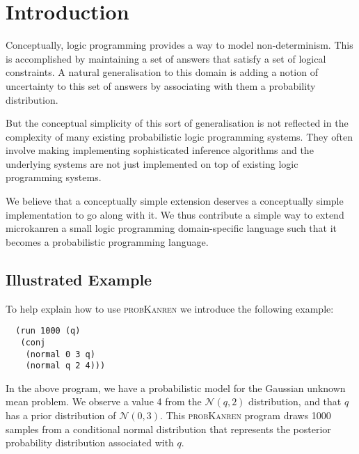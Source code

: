 \documentclass[
]{ceurart}
\begin{document}
\maketitle

\section{Introduction}

Conceptually, logic programming provides a way to model
non-determinism. This is accomplished by maintaining a set of answers
that satisfy a set of logical constraints. A natural generalisation
to this domain is adding a notion of uncertainty to this set of answers
by associating with them a probability distribution.

But the conceptual simplicity of this sort of generalisation is not
reflected in the complexity of many existing probabilistic logic
programming systems.  They often involve making implementing
sophisticated inference algorithms and the underlying systems are not
just implemented on top of existing logic programming systems.

We believe that a conceptually simple extension deserves a
conceptually simple implementation to go along with it. We thus
contribute a simple way to extend microkanren a small logic
programming domain-specific language such that it becomes a
probabilistic programming language.

\subsection{Illustrated Example}

To help explain how to use \textsc{probKanren} we introduce the following example:


\begin{verbatim}
  (run 1000 (q)
   (conj
    (normal 0 3 q)
    (normal q 2 4)))
\end{verbatim}


In the above program, we have a probabilistic model for the Gaussian
unknown mean problem. We observe a value 4 from the $\mathcal{N}(q,2)$
distribution, and that $q$ has a prior distribution of $\mathcal{N}(0, 3)$.
This \textsc{probKanren} program draws 1000 samples from a conditional normal distribution
that represents the posterior probability distribution associated with $q$.
\end{document}
